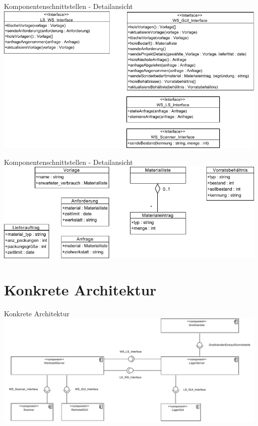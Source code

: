 \documentclass{beamer}
\begin{document}
\begin{frame}{Komponentenschnittstellen - Detailansicht}
\includegraphics[height=0.75\textheight]{PDF/Schnittstellen_rechts_oben.pdf}
\end{frame}
\begin{frame}{Komponentenschnittstellen - Detailansicht}
\includegraphics[width=\linewidth]{PDF/Schnittstellen_rechts_unten.pdf}
\end{frame}
	\section{Konkrete Architektur}
	\begin{frame}{Konkrete Architektur}
		\includegraphics[width=\textwidth]{PDF/Konkrete_Architektur.pdf}
	\end{frame}
\end{document}
